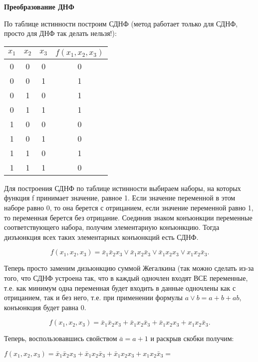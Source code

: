 \documentclass[11pt]{article}
\begin{document}
\textbf{Преобразование ДНФ}

По таблице истинности построим СДНФ (метод работает только для
СДНФ, просто для ДНФ так делать нельзя!):

\begin{center}
        \begin{tabular}{ |c|c|c|c| }
                \hline
				$x_1$ & $x_2$ & $x_3$ & $f(x_1,x_2,x_3)$\\
                \hline
				0 & 0 & 0 & 0\\
                \hline
				0 & 0 & 1 & 1\\
                \hline
				0 & 1 & 0 & 1\\
                \hline
				0 & 1 & 1 & 1\\
                \hline
				1 & 0 & 0 & 0\\
                \hline
				1 & 0 & 1 & 0\\
                \hline
                1 & 1 & 0 & 1\\
                \hline
                1 & 1 & 1 & 0\\
                \hline
        \end{tabular}
\end{center}

Для построения СДНФ по таблице истинности выбираем наборы, на
которых функция f принимает значение, равное 1. Если значение переменной в
этом наборе равно 0, то она берется с отрицанием, если значение переменной
равно 1, то переменная берется без отрицание. Соединив знаком конъюнкции
переменные соответствующего набора, получим элементарную конъюнкцию.
Тогда дизъюнкция всех таких элементарных конъюнкций есть СДНФ.

$$f(x_1,x_2,x_3)=\bar x_1 \bar x_2 x_3 \lor \bar x_1 x_2 \bar x_3 \lor \bar x_1 x_2x_3 \lor x_1x_2 \bar x_3.$$

Теперь просто заменим дизьюнкцию суммой Жегалкина (так можно
сделать из-за того, что СДНФ устроена так, что в каждый одночлен входят ВСЕ
переменные, т.е. как минимум одна переменная будет входить в данные
одночлены как с отрицанием, так и без него, т.е. при применении формулы $a \lor b = a + b + ab$, конъюнкция будет равна 0.

$$f(x_1,x_2,x_3)=\bar x_1 \bar x_2 x_3 + \bar x_1 x_2 \bar x_3 + \bar x_1 x_2x_3 + x_1x_2 \bar x_3.$$

Теперь, воспользовавшись свойством $\bar a = a + 1$ и раскрыв скобки
получим:

$f(x_1,x_2,x_3)=\bar x_1 \bar x_2 x_3 + \bar x_1 x_2 \bar x_3 + \bar x_1 x_2x_3 + x_1x_2 \bar x_3 = $
\end{document}
